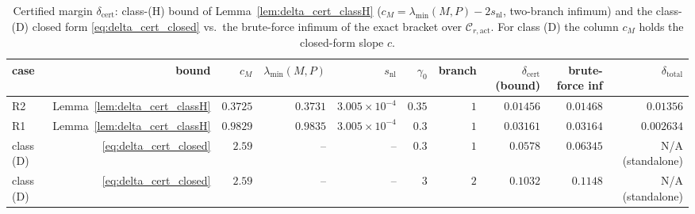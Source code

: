 \begin{table}[t]
\centering
\caption{Certified margin $\delta_{\mathrm{cert}}$: class-(H) bound of Lemma~\ref{lem:delta_cert_classH} ($c_M=\lambda_{\min}(M,P)-2s_{\mathrm{nl}}$, two-branch infimum) and the class-(D) closed form \eqref{eq:delta_cert_closed} vs.\ the brute-force infimum of the exact bracket over $\mathcal{C}_{r,\mathrm{act}}$. For class (D) the column $c_M$ holds the closed-form slope $c$.}
\label{tab:exp3_delta_cert}
\footnotesize
\setlength{\tabcolsep}{3pt}
\begin{tabular}{lrrrrrrrrr}
\toprule
case & bound & $c_M$ & $\lambda_{\min}(M,P)$ & $s_{\mathrm{nl}}$ & $\gamma_0$ & branch & $\delta_{\mathrm{cert}}$ (bound) & brute-force inf & $\delta_{\mathrm{total}}$ \\
\midrule
R2 & Lemma~\ref{lem:delta_cert_classH} & $0.3725$ & $0.3731$ & $3.005\times10^{-4}$ & $0.35$ & $1$ & $0.01456$ & $0.01468$ & $0.01356$ \\
R1 & Lemma~\ref{lem:delta_cert_classH} & $0.9829$ & $0.9835$ & $3.005\times10^{-4}$ & $0.3$ & $1$ & $0.03161$ & $0.03164$ & $0.002634$ \\
class (D) & \eqref{eq:delta_cert_closed} & $2.59$ & -- & -- & $0.3$ & $1$ & $0.0578$ & $0.06345$ & N/A (standalone) \\
class (D) & \eqref{eq:delta_cert_closed} & $2.59$ & -- & -- & $3$ & $2$ & $0.1032$ & $0.1148$ & N/A (standalone) \\
\bottomrule
\end{tabular}
\end{table}
